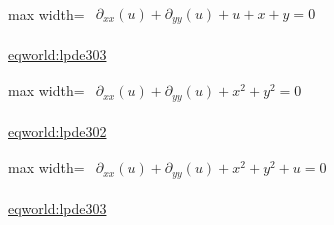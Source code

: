 \documentclass[10pt,a4paper]{article}
\begin{document}
\begin{minipage}{\linewidth}
\begin{center}\begin{adjustbox}{max width=\linewidth}$\displaystyle\begin{gathered}\begin{gathered}\partial_{xx}(u)+\partial_{yy}(u)+u+x+y=0\end{gathered}\end{gathered}$\end{adjustbox}\end{center}
{\small \href{https://eqworld.ipmnet.ru/en/solutions/lpde/lpde303.pdf}{eqworld:lpde303}}\par
\end{minipage}\par\vspace{7mm}

\begin{minipage}{\linewidth}
\begin{center}\begin{adjustbox}{max width=\linewidth}$\displaystyle\begin{gathered}\begin{gathered}\partial_{xx}(u)+\partial_{yy}(u)+x^{2}+y^{2}=0\end{gathered}\end{gathered}$\end{adjustbox}\end{center}
{\small \href{https://eqworld.ipmnet.ru/en/solutions/lpde/lpde302.pdf}{eqworld:lpde302}}\par
\end{minipage}\par\vspace{7mm}

\begin{minipage}{\linewidth}
\begin{center}\begin{adjustbox}{max width=\linewidth}$\displaystyle\begin{gathered}\begin{gathered}\partial_{xx}(u)+\partial_{yy}(u)+x^{2}+y^{2}+u=0\end{gathered}\end{gathered}$\end{adjustbox}\end{center}
{\small \href{https://eqworld.ipmnet.ru/en/solutions/lpde/lpde303.pdf}{eqworld:lpde303}}\par
\end{minipage}\par\vspace{7mm}
\end{document}
